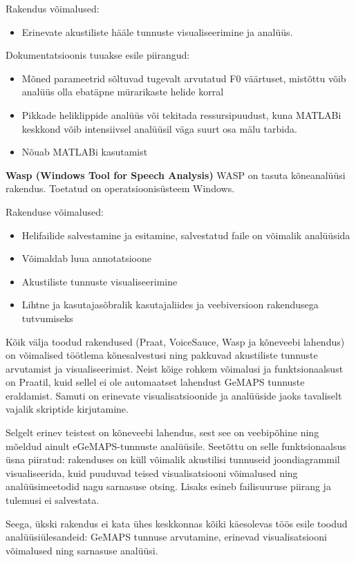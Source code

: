 Rakendus võimalused:
\begin{itemize}
    \item Erinevate akustiliste hääle tunnuste visualiseerimine ja analüüs.
\end{itemize}
Dokumentatsioonis tuuakse esile piirangud:
\begin{itemize}
    \item Mõned parameetrid sõltuvad tugevalt arvutatud F0 väärtuset, mistõttu võib analüüs olla ebatäpne mürarikaste helide korral
    \item Pikkade heliklippide analüüs või tekitada ressursipuudust, kuna MATLABi keskkond võib intensiivsel analüüsil väga suurt osa mälu tarbida.
    \item Nõuab MATLABi kasutamist
\end{itemize} \cite{voicesauce}

\textbf{Wasp (Windows Tool for Speech Analysis)}
WASP on tasuta kõneanalüüsi rakendus. Toetatud on operatsioonisüsteem Windows.

Rakenduse võimalused:
\begin{itemize}
    \item Helifailide salvestamine ja esitamine, salvestatud faile on võimalik analüüsida
    \item Võimaldab luua annotatsioone
    \item Akustiliste tunnuste visualiseerimine
    \item Lihtne ja kasutajasõbralik kasutajaliides ja veebiversioon rakendusega tutvumiseks
\end{itemize} \cite{wasp}

Kõik välja toodud rakendused (Praat, VoiceSauce, Wasp ja kõneveebi lahendus) on võimalised töötlema kõnesalvestusi ning pakkuvad akustiliste tunnuste arvutamist ja visualiseerimist. Neist kõige rohkem võimalusi ja funktsionaalsust on Praatil, kuid sellel ei ole automaatset lahendust GeMAPS tunnuste eraldamist. Samuti on erinevate visualisatsioonide ja analüüside jaoks tavaliselt vajalik skriptide kirjutamine.

Selgelt erinev teistest on kõneveebi lahendus, sest see on veebipõhine ning mõeldud ainult eGeMAPS-tunnuste analüüsile. Seetõttu on selle funktsionaalsus üsna piiratud: rakenduses on küll võimalik akustilisi tunnuseid joondiagrammil visualiseerida, kuid puuduvad teised visualisatsiooni võimalused ning analüüsimeetodid nagu sarnasuse otsing. Lisaks esineb failisuuruse piirang ja tulemusi ei salvestata.

Seega, ükski rakendus ei kata ühes keskkonnas kõiki käesolevas töös esile toodud analüüsiülesandeid: GeMAPS tunnuse arvutamine, erinevad visualisatsiooni võimalused ning sarnasuse analüüsi.
